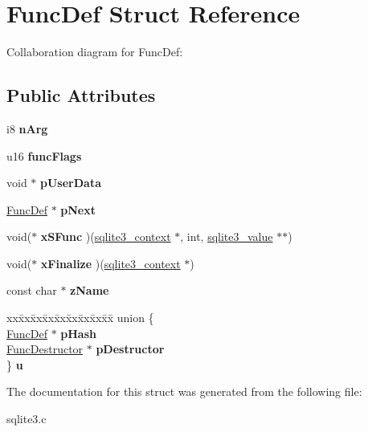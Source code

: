 \hypertarget{structFuncDef}{}\section{Func\+Def Struct Reference}
\label{structFuncDef}


Collaboration diagram for Func\+Def\+:
\subsection*{Public Attributes}
\begin{DoxyCompactItemize}
\item 
i8 {\bfseries n\+Arg}\hypertarget{structFuncDef_a65d2af5dc68a0344efb368b8ce1b9141}{}\label{structFuncDef_a65d2af5dc68a0344efb368b8ce1b9141}

\item 
u16 {\bfseries func\+Flags}\hypertarget{structFuncDef_a4cd12fdb0da08ec8a5fb41f8bcd09e78}{}\label{structFuncDef_a4cd12fdb0da08ec8a5fb41f8bcd09e78}

\item 
void $\ast$ {\bfseries p\+User\+Data}\hypertarget{structFuncDef_a04fdde2f96be198823a483bebcfd3ae3}{}\label{structFuncDef_a04fdde2f96be198823a483bebcfd3ae3}

\item 
\hyperlink{structFuncDef}{Func\+Def} $\ast$ {\bfseries p\+Next}\hypertarget{structFuncDef_a1ebe547d000172d9ae44d12eeb433a48}{}\label{structFuncDef_a1ebe547d000172d9ae44d12eeb433a48}

\item 
void($\ast$ {\bfseries x\+S\+Func} )(\hyperlink{structsqlite3__context}{sqlite3\+\_\+context} $\ast$, int, \hyperlink{structMem}{sqlite3\+\_\+value} $\ast$$\ast$)\hypertarget{structFuncDef_a64986fd7c3b2a3715f5e7a54c0ef385e}{}\label{structFuncDef_a64986fd7c3b2a3715f5e7a54c0ef385e}

\item 
void($\ast$ {\bfseries x\+Finalize} )(\hyperlink{structsqlite3__context}{sqlite3\+\_\+context} $\ast$)\hypertarget{structFuncDef_a2315fa9b1a173dca2ba0c506548b83f9}{}\label{structFuncDef_a2315fa9b1a173dca2ba0c506548b83f9}

\item 
const char $\ast$ {\bfseries z\+Name}\hypertarget{structFuncDef_ac732c25b31e5c5a5390db76e74724024}{}\label{structFuncDef_ac732c25b31e5c5a5390db76e74724024}

\item 
\begin{tabbing}
xx\=xx\=xx\=xx\=xx\=xx\=xx\=xx\=xx\=\kill
union \{\\
\>\hyperlink{structFuncDef}{FuncDef} $\ast$ {\bfseries pHash}\\
\>\hyperlink{structFuncDestructor}{FuncDestructor} $\ast$ {\bfseries pDestructor}\\
\} {\bfseries u}\hypertarget{structFuncDef_a0ed4a95c4ba5c803bfe7adf48888c2dd}{}\label{structFuncDef_a0ed4a95c4ba5c803bfe7adf48888c2dd}
\\

\end{tabbing}\end{DoxyCompactItemize}


The documentation for this struct was generated from the following file\+:\begin{DoxyCompactItemize}
\item 
sqlite3.\+c\end{DoxyCompactItemize}
